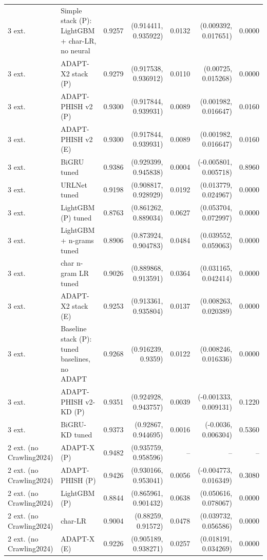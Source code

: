 \begin{table}[t]
\begin{tabular}{llrrrrr}
3 ext. & Simple stack (P): LightGBM + char-LR, no neural & 0.9257 & (0.914411, 0.935922) & 0.0132 & (0.009392, 0.017651) & 0.0000 \\
3 ext. & ADAPT-X2 stack (P) & 0.9279 & (0.917538, 0.936912) & 0.0110 & (0.00725, 0.015268) & 0.0000 \\
3 ext. & ADAPT-PHISH v2 (P) & 0.9300 & (0.917844, 0.939931) & 0.0089 & (0.001982, 0.016647) & 0.0160 \\
3 ext. & ADAPT-PHISH v2 (E) & 0.9300 & (0.917844, 0.939931) & 0.0089 & (0.001982, 0.016647) & 0.0160 \\
3 ext. & BiGRU tuned & 0.9386 & (0.929399, 0.945838) & 0.0004 & (-0.005801, 0.005718) & 0.8960 \\
3 ext. & URLNet tuned & 0.9198 & (0.908817, 0.928929) & 0.0192 & (0.013779, 0.024967) & 0.0000 \\
3 ext. & LightGBM (P) tuned & 0.8763 & (0.861262, 0.889034) & 0.0627 & (0.053704, 0.072997) & 0.0000 \\
3 ext. & LightGBM + n-grams tuned & 0.8906 & (0.873924, 0.904783) & 0.0484 & (0.039552, 0.059063) & 0.0000 \\
3 ext. & char n-gram LR tuned & 0.9026 & (0.889868, 0.913591) & 0.0364 & (0.031165, 0.042414) & 0.0000 \\
3 ext. & ADAPT-X2 stack (E) & 0.9253 & (0.913361, 0.935804) & 0.0137 & (0.008263, 0.020389) & 0.0000 \\
3 ext. & Baseline stack (P): tuned baselines, no ADAPT & 0.9268 & (0.916239, 0.9359) & 0.0122 & (0.008246, 0.016336) & 0.0000 \\
3 ext. & ADAPT-PHISH v2-KD (P) & 0.9351 & (0.924928, 0.943757) & 0.0039 & (-0.001333, 0.009131) & 0.1220 \\
3 ext. & BiGRU-KD tuned & 0.9373 & (0.92867, 0.944695) & 0.0016 & (-0.0036, 0.006304) & 0.5360 \\
2 ext. (no Crawling2024) & ADAPT-X (P) & 0.9482 & (0.935759, 0.958596) & -- & -- & -- \\
2 ext. (no Crawling2024) & ADAPT-PHISH (P) & 0.9426 & (0.930166, 0.953041) & 0.0056 & (-0.004773, 0.016349) & 0.3080 \\
2 ext. (no Crawling2024) & LightGBM (P) & 0.8844 & (0.865961, 0.901432) & 0.0638 & (0.050616, 0.078067) & 0.0000 \\
2 ext. (no Crawling2024) & char-LR & 0.9004 & (0.88259, 0.91572) & 0.0478 & (0.039732, 0.056586) & 0.0000 \\
2 ext. (no Crawling2024) & ADAPT-X (E) & 0.9226 & (0.905189, 0.938271) & 0.0257 & (0.018191, 0.034269) & 0.0000 \\

\end{tabular}
\end{table}
